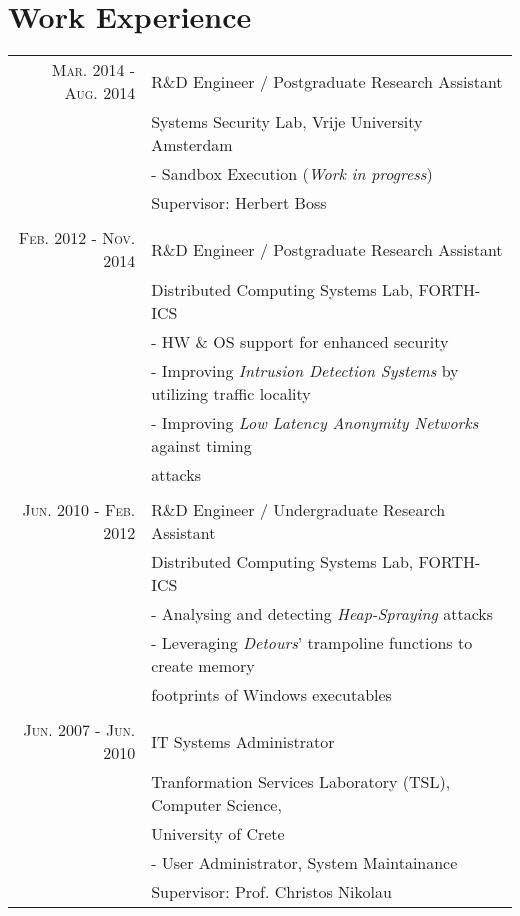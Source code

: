 \documentclass[a4paper,10pt]{article} %
\begin{document}

\section{Work Experience}
\begin{tabular}{rl}


\textsc{Mar. 2014 - Aug. 2014} & R\&D Engineer / Postgraduate Research Assistant \\
& Systems Security Lab, Vrije University Amsterdam \\
& - Sandbox Execution (\emph{Work in progress}) \\
& Supervisor: Herbert Boss \\
\\


\textsc{Feb. 2012 - Nov. 2014} & R\&D Engineer / Postgraduate Research Assistant \\
& Distributed Computing Systems Lab, FORTH-ICS \\
& - HW \& OS support for enhanced security \\
& - Improving \emph{Intrusion Detection Systems} by utilizing traffic locality \\
& - Improving \emph{Low Latency Anonymity Networks} against timing \\
&   attacks \\
\\

\textsc{Jun. 2010 - Feb. 2012} & R\&D Engineer / Undergraduate Research Assistant \\
& Distributed Computing Systems Lab, FORTH-ICS \\
& - Analysing and detecting \emph{Heap-Spraying} attacks \\
& - Leveraging \emph{Detours}' trampoline functions to create memory \\
& footprints of Windows executables\\
\\

\textsc{Jun. 2007 - Jun. 2010} & IT Systems Administrator \\
& Tranformation Services Laboratory (TSL), Computer Science, \\
& University of Crete \\
& - User Administrator, System Maintainance \\
& Supervisor: Prof. Christos Nikolau

\end{tabular}
\end{document}
